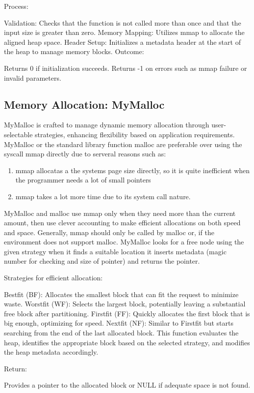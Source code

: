 \documentclass[conference]{IEEEtran}
\begin{document}
Process:

Validation: Checks that the function is not called more than once and that the input size is greater than zero.
Memory Mapping: Utilizes mmap to allocate the aligned heap space.
Header Setup: Initializes a metadata header at the start of the heap to manage memory blocks.
Outcome:

Returns 0 if initialization succeeds.
Returns -1 on errors such as mmap failure or invalid parameters.
\subsection{Memory Allocation: MyMalloc}
MyMalloc is crafted to manage dynamic memory allocation through user-selectable strategies, enhancing flexibility based on application requirements. MyMalloc or the standard library function malloc are preferable over using the syscall mmap directly due to serveral reasons such as:
\begin{enumerate}
    \item mmap allocatas a the systems page size directly, so it is quite inefficient when the programmer needs a lot of small pointers
    \item mmap takes a lot more time due to its system call nature.
\end{enumerate}
MyMalloc and malloc use mmap only when they need more than the current amount, then use clever accounting to make efficient allocations on both speed and space. Generally, mmap should only be called by malloc or, if the environment does not support malloc. MyMalloc looks for a free node using the given strategy when it finds a suitable location it inserts metadata (magic number for checking and size of pointer) and returns the pointer.

Strategies for efficient allocation:

Bestfit (BF): Allocates the smallest block that can fit the request to minimize waste.
Worstfit (WF): Selects the largest block, potentially leaving a substantial free block after partitioning.
Firstfit (FF): Quickly allocates the first block that is big enough, optimizing for speed.
Nextfit (NF): Similar to Firstfit but starts searching from the end of the last allocated block.
This function evaluates the heap, identifies the appropriate block based on the selected strategy, and modifies the heap metadata accordingly.

Return:

Provides a pointer to the allocated block or NULL if adequate space is not found.
\end{document}
